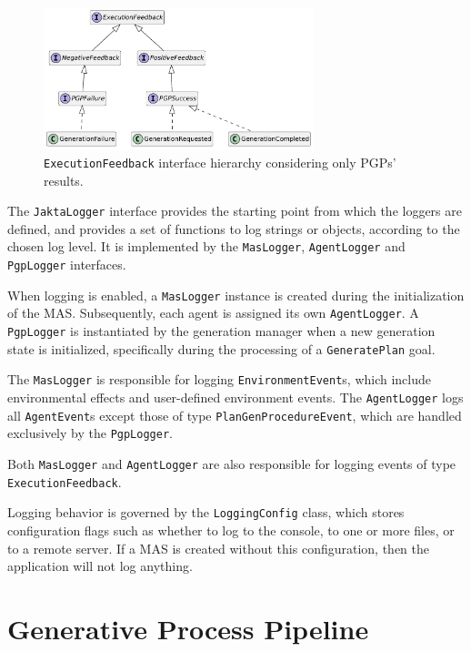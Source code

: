 \documentclass[12pt,a4paper,openright,twoside]{book}
\begin{document}
\begin{figure}
    \centering
    \includegraphics[width=0.7\textwidth]{figures/exec-feed-pgp.pdf}
    \caption{\texttt{ExecutionFeedback} interface hierarchy considering only PGPs' results.}
    \label{fig:execution-feedback-pgp}
\end{figure}

The \texttt{JaktaLogger} interface provides the starting point from which the loggers are defined, and provides a set of functions to log strings or objects, according to the chosen log level. 
%
It is implemented by the \texttt{MasLogger}, \texttt{AgentLogger} and \texttt{PgpLogger} interfaces.

When logging is enabled, a \texttt{MasLogger} instance is created during the initialization of the \ac{MAS}.
%
Subsequently, each agent is assigned its own \texttt{AgentLogger}.
%
A \texttt{PgpLogger} is instantiated by the generation manager when a new generation state is initialized, specifically during the processing of a \texttt{GeneratePlan} goal.

The \texttt{MasLogger} is responsible for logging \texttt{EnvironmentEvent}s, which include environmental effects and user-defined environment events.
%
The \texttt{AgentLogger} logs all \texttt{AgentEvent}s except those of type \texttt{PlanGenProcedureEvent}, which are handled exclusively by the \texttt{PgpLogger}.

Both \texttt{MasLogger} and \texttt{AgentLogger} are also responsible for logging events of type \texttt{ExecutionFeedback}.

Logging behavior is governed by the \texttt{LoggingConfig} class, which stores configuration flags such as whether to log to the console, to one or more files, or to a remote server. 
%
If a \ac{MAS} is created without this configuration, then the application will not log anything.

\section{Generative Process Pipeline}\label{sec:generative-pipeline}
\end{document}
